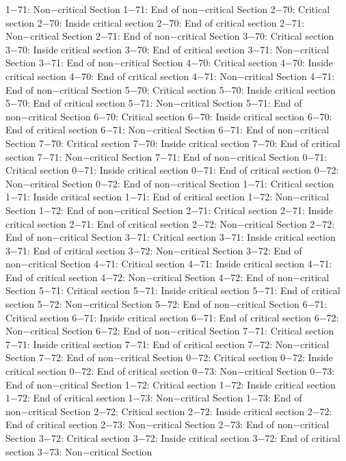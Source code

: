 1−71: Non−critical Section
1−71: End of non−critical Section
2−70: Critical section
2−70: Inside critical section
2−70: End of critical section
2−71: Non−critical Section
2−71: End of non−critical Section
3−70: Critical section
3−70: Inside critical section
3−70: End of critical section
3−71: Non−critical Section
3−71: End of non−critical Section
4−70: Critical section
4−70: Inside critical section
4−70: End of critical section
4−71: Non−critical Section
4−71: End of non−critical Section
5−70: Critical section
5−70: Inside critical section
5−70: End of critical section
5−71: Non−critical Section
5−71: End of non−critical Section
6−70: Critical section
6−70: Inside critical section
6−70: End of critical section
6−71: Non−critical Section
6−71: End of non−critical Section
7−70: Critical section
7−70: Inside critical section
7−70: End of critical section
7−71: Non−critical Section
7−71: End of non−critical Section
0−71: Critical section
0−71: Inside critical section
0−71: End of critical section
0−72: Non−critical Section
0−72: End of non−critical Section
1−71: Critical section
1−71: Inside critical section
1−71: End of critical section
1−72: Non−critical Section
1−72: End of non−critical Section
2−71: Critical section
2−71: Inside critical section
2−71: End of critical section
2−72: Non−critical Section
2−72: End of non−critical Section
3−71: Critical section
3−71: Inside critical section
3−71: End of critical section
3−72: Non−critical Section
3−72: End of non−critical Section
4−71: Critical section
4−71: Inside critical section
4−71: End of critical section
4−72: Non−critical Section
4−72: End of non−critical Section
5−71: Critical section
5−71: Inside critical section
5−71: End of critical section
5−72: Non−critical Section
5−72: End of non−critical Section
6−71: Critical section
6−71: Inside critical section
6−71: End of critical section
6−72: Non−critical Section
6−72: End of non−critical Section
7−71: Critical section
7−71: Inside critical section
7−71: End of critical section
7−72: Non−critical Section
7−72: End of non−critical Section
0−72: Critical section
0−72: Inside critical section
0−72: End of critical section
0−73: Non−critical Section
0−73: End of non−critical Section
1−72: Critical section
1−72: Inside critical section
1−72: End of critical section
1−73: Non−critical Section
1−73: End of non−critical Section
2−72: Critical section
2−72: Inside critical section
2−72: End of critical section
2−73: Non−critical Section
2−73: End of non−critical Section
3−72: Critical section
3−72: Inside critical section
3−72: End of critical section
3−73: Non−critical Section

